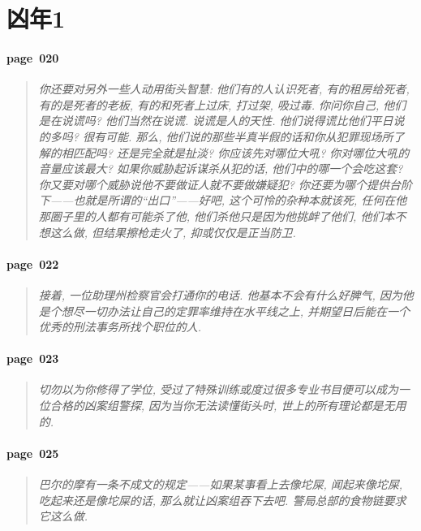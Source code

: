 \section{凶年1}

\paragraph*{page~020}
\begin{quotation}
    \itshape
    你还要对另外一些人动用街头智慧: 他们有的人认识死者, 有的租房给死者, 有的是死者的老板, 有的和死者上过床, 打过架, 吸过毒. 你问你自己, 他们是在说谎吗? 他们当然在说谎. 说谎是人的天性. 他们说得谎比他们平日说的多吗? 很有可能. 那么, 他们说的那些半真半假的话和你从犯罪现场所了解的相匹配吗? 还是完全就是扯淡? 你应该先对哪位大吼? 你对哪位大吼的音量应该最大? 如果你威胁起诉谋杀从犯的话, 他们中的哪一个会吃这套? 你又要对哪个威胁说他不要做证人就不要做嫌疑犯? 你还要为哪个提供台阶下------也就是所谓的``出口''------好吧, 这个可怜的杂种本就该死, 任何在他那圈子里的人都有可能杀了他, 他们杀他只是因为他挑衅了他们, 他们本不想这么做, 但结果擦枪走火了, 抑或仅仅是正当防卫.
\end{quotation}

\paragraph*{page~022}
\begin{quotation}
    \itshape
    接着, 一位助理州检察官会打通你的电话. 他基本不会有什么好脾气, 因为他是个想尽一切办法让自己的定罪率维持在水平线之上, 并期望日后能在一个优秀的刑法事务所找个职位的人.
\end{quotation}

\paragraph*{page~023}
\begin{quotation}
    \itshape
    切勿以为你修得了学位, 受过了特殊训练或度过很多专业书目便可以成为一位合格的凶案组警探, 因为当你无法读懂街头时, 世上的所有理论都是无用的.
\end{quotation}

\paragraph*{page~025}
\begin{quotation}
    \itshape
    巴尔的摩有一条不成文的规定------如果某事看上去像坨屎, 闻起来像坨屎, 吃起来还是像坨屎的话, 那么就让凶案组吞下去吧. 警局总部的食物链要求它这么做. 
\end{quotation}

